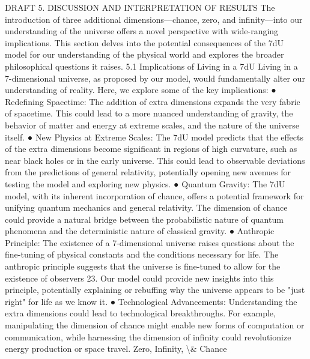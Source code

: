 \documentclass[12pt]{article}
\begin{document}
DRAFT
5. DISCUSSION AND INTERPRETATION OF RESULTS
The introduction of three additional dimensions—chance, zero, and inﬁnity—into our understanding
of the universe oﬀers a novel perspective with wide-ranging implications. This section delves into
the potential consequences of the 7dU model for our understanding of the physical world and
explores the broader philosophical questions it raises.
5.1 Implications of Living in a 7dU
Living in a 7-dimensional universe, as proposed by our model, would fundamentally alter
our understanding of reality. Here, we explore some of the key implications:
●
Redeﬁning Spacetime: The addition of extra dimensions expands the very fabric of
spacetime. This could lead to a more nuanced understanding of gravity, the
behavior of matter and energy at extreme scales, and the nature of the universe
itself.
●
New Physics at Extreme Scales: The 7dU model predicts that the eﬀects of the
extra dimensions become signiﬁcant in regions of high curvature, such as near
black holes or in the early universe. This could lead to observable deviations from
the predictions of general relativity, potentially opening new avenues for testing the
model and exploring new physics.
●
Quantum Gravity: The 7dU model, with its inherent incorporation of chance, oﬀers a
potential framework for unifying quantum mechanics and general relativity. The
dimension of chance could provide a natural bridge between the probabilistic nature
of quantum phenomena and the deterministic nature of classical gravity.
●
Anthropic Principle: The existence of a 7-dimensional universe raises questions
about the ﬁne-tuning of physical constants and the conditions necessary for life.
The anthropic principle suggests that the universe is ﬁne-tuned to allow for the
existence of observers 23. Our model could provide new insights into this principle,
potentially explaining or rebuﬃng why the universe appears to be "just right" for life
as we know it.
●
Technological Advancements: Understanding the extra dimensions could lead to
technological breakthroughs. For example, manipulating the dimension of chance
might enable new forms of computation or communication, while harnessing the
dimension of inﬁnity could revolutionize energy production or space travel.
Zero, Infinity, \textbackslash{}& Chance
\end{document}
